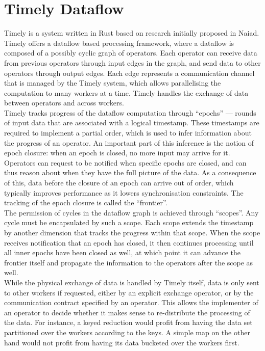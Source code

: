 \section{Timely Dataflow}
Timely\cite{timely} is a system written in Rust based on research initially proposed in Naiad\cite{naiad}. Timely offers a dataflow based processing framework, where a dataflow is composed of a possibly cyclic graph of operators. Each operator can receive data from previous operators through input edges in the graph, and send data to other operators through output edges. Each edge represents a communication channel that is managed by the Timely system, which allows parallelising the computation to many workers at a time. Timely handles the exchange of data between operators and across workers. \\

Timely tracks progress of the dataflow computation through ``epochs'' --- rounds of input data that are associated with a logical timestamp. These timestamps are required to implement a partial order, which is used to infer information about the progress of an operator. An important part of this inference is the notion of epoch closure: when an epoch is closed, no more input may arrive for it. Operators can request to be notified when specific epochs are closed, and can thus reason about when they have the full picture of the data. As a consequence of this, data before the closure of an epoch can arrive out of order, which typically improves performance as it lowers synchronisation constraints. The tracking of the epoch closure is called the ``frontier''. \\

The permission of cycles in the dataflow graph is achieved through ``scopes''. Any cycle must be encapsulated by such a scope. Each scope extends the timestamp by another dimension that tracks the progress within that scope. When the scope receives notification that an epoch has closed, it then continues processing until all inner epochs have been closed as well, at which point it can advance the frontier itself and propagate the information to the operators after the scope as well. \\

While the physical exchange of data is handled by Timely itself, data is only sent to other workers if requested, either by an explicit exchange operator, or by the communication contract specified by an operator. This allows the implementer of an operator to decide whether it makes sense to re-distribute the processing of the data. For instance, a keyed reduction would profit from having the data set partitioned over the workers according to the keys. A simple map on the other hand would not profit from having its data bucketed over the workers first. \\

